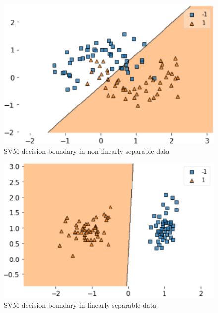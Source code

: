 \documentclass[10pt,twocolumn,letterpaper]{article}
\begin{document}
\begin{figure}[htb]
  \includegraphics[width=\linewidth]{svm_lin_non_sep.png}
  \caption{SVM decision boundary in non-linearly separable data}
  \label{fig:svm_exp_non_lin}
\end{figure}

\vspace{3.00mm} 

\begin{figure}[htb]
  \includegraphics[width=\linewidth]{svm_lin_sep.png}
  \caption{SVM decision boundary in linearly separable data}
  \label{fig:svm_exp_lin}
\end{figure}

\vspace{50.00mm} 
\end{document}

